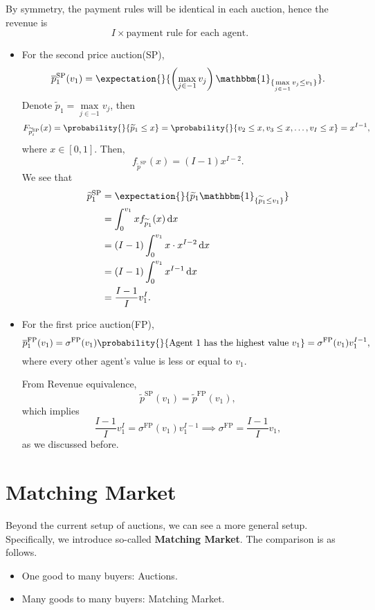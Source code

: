 By symmetry, the payment rules will be identical in each auction, hence the revenue is
\[
	I\times \text{payment rule for each agent}.
\]

\begin{itemize}
	\item For the second price auction(SP),
	      \[
		      \overline{p}_1^{\mathrm{SP}}(v_1) = \expectation{}{\left(\max_{j\in -1}v_{j}\right)\mathbbm{1}_{\{ \max\limits_{j\in -1} v_{j}\leq v_1\}} }.
	      \]
	      Denote \(\widetilde{p}_1 = \max\limits_{j\in -1} v_{j}\), then
	      \[
		      F_{\widetilde{p}^{\mathrm{SP}}_i}(x) = \probability{}{\widetilde{p}_1\leq x} = \probability{}{v_2\leq x, v_3\leq x, \ldots , v_I\leq x} = x^{I-1},
	      \]
	      where \(x\in [0, 1]\). Then,
	      \[
		      f_{\widetilde{p}^{\mathrm{SP}}}(x) = (I - 1)x^{I-2}.
	      \]
	      We see that
	      \[
		      \begin{split}
			      \widetilde{p}_1^{\mathrm{SP}} &= \expectation{}{\widetilde{p}_{1}\mathbbm{1}_{\{ \widetilde{p}_1\leq v_1 \}} }\\
			      &=\int_0^{v_1} xf_{\widetilde{p}_1}(x)\,\mathrm{d}x \\
			      &= (I - 1)\int_0^{v_1}x\cdot x^{I-2}\,\mathrm{d}x \\
			      &= (I - 1)\int_0^{v_1}x^{I-1}\,\mathrm{d}x\\
			      & = \frac{I-1}{I}v_1^I.
		      \end{split}
	      \]
	\item For the first price auction(FP),
	      \[
		      \overline{p}_1^{\mathrm{FP}}(v_1) = \sigma^{\mathrm{FP}}(v_1)\probability{}{\text{Agent 1 has the highest value \(v_1\)}} = \sigma^{\mathrm{FP}}(v_1)v_1^{I-1},
	      \]
	      where every other agent's value is less or equal to \(v_1\).

	      From Revenue equivalence,
	      \[
		      \widetilde{p}^{\mathrm{SP}}(v_1) = \widetilde{p}^{\mathrm{FP}}(v_1),
	      \]
	      which implies
	      \[
		      \frac{I-1}{I}v_{1}^I = \sigma^{\mathrm{FP}}(v_1)v_1^{I-1} \implies \sigma^{\mathrm{FP}} = \frac{I-1}{I}v_1,
	      \]
	      as we discussed before.
\end{itemize}

\section{Matching Market}
Beyond the current setup of auctions, we can see a more general setup. Specifically, we introduce so-called \textbf{Matching Market}. The comparison is as follows.
\begin{itemize}
	\item One good to many buyers: Auctions.
	\item Many goods to many buyers: Matching Market.
\end{itemize}

